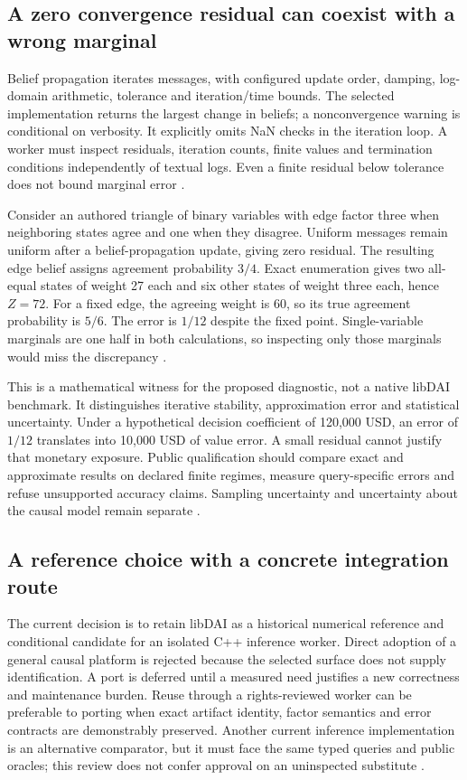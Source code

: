 \subsection{A zero convergence residual can coexist with a wrong marginal}
Belief propagation iterates messages, with configured update order, damping,
log-domain arithmetic, tolerance and iteration/time bounds. The selected
implementation returns the largest change in beliefs; a nonconvergence
warning is conditional on verbosity. It explicitly omits NaN checks in the
iteration loop. A worker must inspect residuals, iteration counts, finite
values and termination conditions independently of textual logs. Even a
finite residual below tolerance does not bound marginal error
\cite{exec24_libdai_source}.

Consider an authored triangle of binary variables with edge factor three
when neighboring states agree and one when they disagree. Uniform messages
remain uniform after a belief-propagation update, giving zero residual.
The resulting edge belief assigns agreement probability $3/4$. Exact
enumeration gives two all-equal states of weight 27 each and six other
states of weight three each, hence $Z=72$. For a fixed edge, the agreeing
weight is 60, so its true agreement probability is $5/6$. The error is
$1/12$ despite the fixed point. Single-variable marginals are one half in
both calculations, so inspecting only those marginals would miss the
discrepancy \cite{exec24_libdai_choice}.

This is a mathematical witness for the proposed diagnostic, not a native
libDAI benchmark. It distinguishes iterative stability, approximation error
and statistical uncertainty. Under a hypothetical decision coefficient of
120,000 USD, an error of $1/12$ translates into 10,000 USD of value error.
A small residual cannot justify that monetary exposure. Public qualification
should compare exact and approximate results on declared finite regimes,
measure query-specific errors and refuse unsupported accuracy claims.
Sampling uncertainty and uncertainty about the causal model remain separate
\cite{exec24_libdai_choice}.

\subsection{A reference choice with a concrete integration route}
The current decision is to retain libDAI as a historical numerical reference
and conditional candidate for an isolated C++ inference worker. Direct
adoption of a general causal platform is rejected because the selected
surface does not supply identification. A port is deferred until a measured
need justifies a new correctness and maintenance burden. Reuse through a
rights-reviewed worker can be preferable to porting when exact artifact
identity, factor semantics and error contracts are demonstrably preserved.
Another current inference implementation is an alternative comparator,
but it must face the same typed queries and public oracles; this review does
not confer approval on an uninspected substitute \cite{exec24_libdai_choice}.

